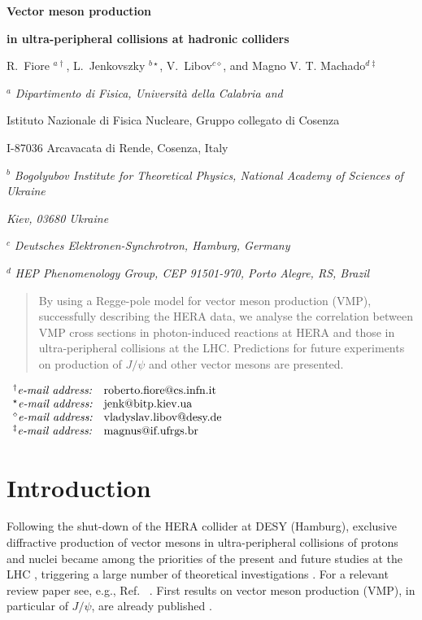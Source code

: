 \documentclass[12pt]{article}
\begin{document}
\vskip 0.5cm \centerline{\bf\Large Vector meson production}
\centerline{\bf\Large in ultra-peripheral collisions at hadronic colliders}  \vskip 0.3cm
\centerline{R.~Fiore $^{a\dagger}$, L.~Jenkovszky $^{b\star}$, V.~Libov$^{c\diamond}$, and Magno V. T. Machado$^{d\ddagger}$}

\vskip 1cm

\centerline{$^a$ \sl Dipartimento di Fisica, Universit\`a  della Calabria and}
\centerline{Istituto Nazionale di Fisica Nucleare, Gruppo collegato di Cosenza}
\centerline{I-87036 Arcavacata di Rende, Cosenza, Italy}
\centerline{$^b$ \sl Bogolyubov Institute for Theoretical Physics,
National Academy of Sciences of Ukraine} \centerline{\sl Kiev,
03680 Ukraine}
\centerline{$^c$ \sl Deutsches Elektronen-Synchrotron, Hamburg, Germany}
\centerline{$^d$ \sl HEP Phenomenology Group, CEP 91501-970, Porto Alegre, RS, Brazil}
\vskip
0.1cm

\begin{abstract}\noindent
By using a Regge-pole model for vector meson production (VMP), successfully describing the HERA data, we analyse the correlation between VMP cross sections in photon-induced reactions at HERA and those in ultra-peripheral collisions at the LHC.
Predictions for future experiments on production of $J/\psi$ and other vector mesons are presented.
\end{abstract}

\vskip 0.1cm

$
\begin{array}{ll}

^{\dagger}\mbox{{\it e-mail address:}} &
   \mbox{roberto.fiore@cs.infn.it} \\
^{\star}\mbox{{\it e-mail address:}} &
   \mbox{jenk@bitp.kiev.ua} \\
^{\diamond}\mbox{{\it e-mail address:}} &
   \mbox{vladyslav.libov@desy.de} \\
^{\ddagger}\mbox{{\it e-mail address:}} &
   \mbox{magnus@if.ufrgs.br} \\
   
\end{array}
$


\section{Introduction}\label{Int}

Following the shut-down of the HERA collider at DESY (Hamburg), exclusive diffractive production of vector mesons in ultra-peripheral collisions of protons and nuclei became among the priorities of the present and future studies at the LHC \cite{LHCb1, LHCb2}, triggering a large number of theoretical investigations \cite{Schafer, Brazil, Ryskin, Motyka, Szczurek}.
For a relevant review paper see, e.g., Ref.~ \cite{Review}.
First results on vector meson production (VMP), in particular of $J/\psi$, are already published \cite{LHCb1, LHCb2}.
\end{document}
